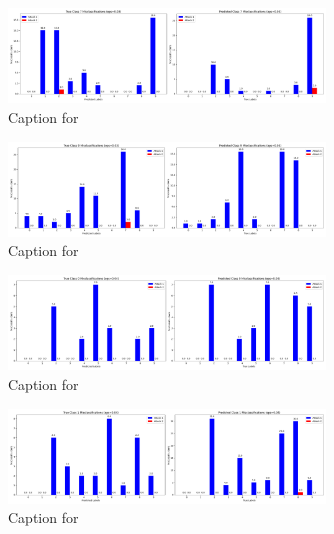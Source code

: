 \documentclass{article}
\begin{document}
\begin{figure}[!htbp]
\centering
\includegraphics[width=0.75\textwidth]{combined_class_boundary_pgd/combined_class_7_misclassifications_eps_0.03.png}
\caption{Caption for }
\label{fig:combined_class_7_misclassifications_eps_0.03.png}
\end{figure}

\begin{figure}[!htbp]
\centering
\includegraphics[width=0.75\textwidth]{combined_class_boundary_pgd/combined_class_9_misclassifications_eps_0.03.png}
\caption{Caption for }
\label{fig:combined_class_9_misclassifications_eps_0.03.png}
\end{figure}

\begin{figure}[!htbp]
\centering
\includegraphics[width=0.75\textwidth]{combined_class_boundary_pgd/combined_class_0_misclassifications_eps_0.04.png}
\caption{Caption for }
\label{fig:combined_class_0_misclassifications_eps_0.04.png}
\end{figure}

\begin{figure}[!htbp]
\centering
\includegraphics[width=0.75\textwidth]{combined_class_boundary_pgd/combined_class_1_misclassifications_eps_0.04.png}
\caption{Caption for }
\label{fig:combined_class_1_misclassifications_eps_0.04.png}
\end{figure}
\end{document}
